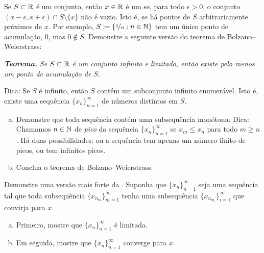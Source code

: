 \begin{exercise}
Se $S \subset {\mathbb{R}}$ é um conjunto, então $x \in {\mathbb{R}}$ é um \emph{}
se, para todo $\epsilon > 0$, o conjunto $(x-\epsilon,x+\epsilon) \cap S
\setminus \{ x \}$ não é vazio. Isto é, se há pontos de $S$
arbitrariamente próximos de $x$.
Por exemplo, $S \coloneqq \{ \nicefrac{1}{n} : n \in {\mathbb{N}} \}$ tem um único ponto de acumulação, $0$, mas $0 \notin S$.
Demonstre a seguinte versão do teorema de Bolzano--Weierstrass:

\medskip

\noindent
\emph{\textbf{Teorema.} Se $S \subset {\mathbb{R}}$ é um conjunto infinito e limitado,
então existe pelo menos um ponto de acumulação de $S$.}

\medskip

Dica: Se $S$ é infinito, então $S$ contém um subconjunto infinito enumerável.
Isto é, existe uma sequência $\{ x_n \}_{n=1}^\infty$ de números distintos em $S$.
\end{exercise}

\begin{samepage}
\begin{exercise}[Desafiador]
\leavevmode
\begin{enumerate}[a)]
\item
Demonstre que toda sequência contém uma subsequência monótona.
Dica: Chamamos $n \in {\mathbb{N}}$ de \emph{pico}
da sequência
$\{ x_n \}_{n=1}^\infty$
se $x_m \leq x_n$ para todo $m \geq n$.
Há duas possibilidades: ou a sequência tem apenas um número finito de
picos,
ou tem infinitos picos.
\item
Conclua o teorema de Bolzano--Weierstrass.
\end{enumerate}
\end{exercise}
\end{samepage}

\begin{exercise}
\pagebreak[2]
Demonstre uma versão mais forte da .
Suponha que $\{ x_n \}_{n=1}^\infty$ seja uma sequência tal que toda subsequência
$\{ x_{n_m} \}_{m=1}^\infty$ tenha uma subsequência
$\{ x_{n_{m_i}} \}_{i=1}^\infty$ que convirja para $x$.
\begin{enumerate}[a)]
\item
Primeiro, mostre que $\{ x_n \}_{n=1}^\infty$ é
limitada.
\item
Em seguida, mostre que $\{ x_n \}_{n=1}^\infty$ converge para $x$.
\end{enumerate}
\end{exercise}

